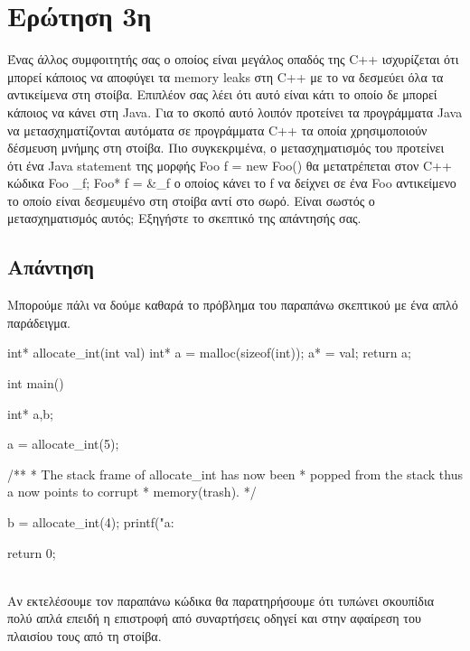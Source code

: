 \documentclass[a4paper]{article}
\begin{document}
\section*{Ερώτηση 3η}
 Ένας άλλος συμφοιτητής σας ο οποίος είναι μεγάλος οπαδός της \foreignlanguage{english}{C++} ισχυρίζεται ότι μπορεί κάποιος να αποφύγει τα \foreignlanguage{english}{memory leaks} στη \foreignlanguage{english}{C++} με το να δεσμεύει όλα τα αντικείμενα στη στοίβα.
Επιπλέον σας λέει ότι αυτό είναι κάτι το οποίο δε μπορεί κάποιος να κάνει στη \foreignlanguage{english}{Java}. Για το σκοπό
αυτό λοιπόν προτείνει τα προγράμματα \foreignlanguage{english}{Java} να μετασχηματίζονται αυτόματα σε προγράμματα
\foreignlanguage{english}{C++} τα οποία χρησιμοποιούν δέσμευση μνήμης στη στοίβα. Πιο συγκεκριμένα, ο μετασχηματισμός του προτείνει ότι ένα \foreignlanguage{english}{Java statement} της μορφής
\foreignlanguage{english}{Foo f = new Foo()} 
θα μετατρέπεται στον
\foreignlanguage{english}{C++} κώδικα
\foreignlanguage{english}{Foo \_f; Foo* f = \&\_f}
ο οποίος κάνει το
\foreignlanguage{english}{f}
να δείχνει σε ένα
\foreignlanguage{english}{Foo}
αντικείμενο το
οποίο είναι δεσμευμένο στη στοίβα αντί στο σωρό.
Είναι σωστός ο μετασχηματισμός αυτός; Εξηγήστε το σκεπτικό της απάντησής σας.

\subsection*{Απάντηση}
Μπορούμε πάλι να δούμε καθαρά το πρόβλημα του παραπάνω σκεπτικού με ένα απλό παράδειγμα.
\begin{otherlanguage}{english}
\begin{code}[frame=single]  
int* allocate_int(int val){
    int* a = malloc(sizeof(int));
    a* = val;
    return a;
}

int main(){
    int* a,b;
    
    a = allocate_int(5);
    
    /** 
     * The stack frame of allocate_int has now been 
     * popped from the stack thus a now points to corrupt 
     * memory(trash).
     */
    
    b = allocate_int(4);
    printf("a: %
    
    return 0;
}

\end{code}
\end{otherlanguage}
\\
Αν εκτελέσουμε τον παραπάνω κώδικα θα παρατηρήσουμε ότι τυπώνει σκουπίδια πολύ απλά επειδή η επιστροφή από συναρτήσεις οδηγεί και στην αφαίρεση του πλαισίου τους από τη στοίβα. 
\end{document}
